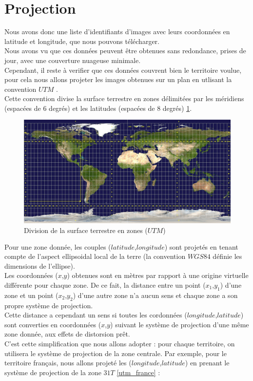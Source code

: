 \documentclass{book}
\begin{document}
\clearpage

\section{Projection}

Nous avons donc une liste d'identifiants d'images avec leurs coordonnées en latitude et longitude, que nous pouvons télécharger.\\
Nous avons vu que ces données peuvent être obtenues sans redondance, prises de jour, avec une couverture nuageuse minimale.\\
Cependant, il reste à verifier que ces données couvrent bien le territoire voulue, pour cela nous allons projeter les images obtenues
sur un plan en utlisant la convention $UTM$ \cite{wiki:utm}.\\
Cette convention divise la surface terrestre en zones délimitées par les méridiens (espacées de 6 degrés) et 
les latitudes (espacées de 8 degrés) \ref{utm}.
\begin{figure}[H]
\begin{center}
\includegraphics[scale=0.3]{images/utm_zones.jpg}
\end{center}
\caption{Division de la surface terrestre en zones ($UTM$) \cite{wiki:utm}}
\label{utm}
\end{figure}

\clearpage

Pour une zone donnée, les couples ($latitude$,$longitude$) sont projetés en tenant compte de l'aspect ellipsoidal local de la terre 
(la convention $WGS84$ définie les dimensions de l'ellipse).\\
Les coordonnées ($x$,$y$) obtenues sont en mètres par rapport à une origine virtuelle différente pour chaque zone. De ce fait, la distance
entre un point ($x_{1}$,$y_{1}$) d'une zone et un point ($x_{2}$,$y_{2}$) d'une autre zone n'a aucun sens et chaque zone a son propre système de projection.\\
Cette distance a cependant un sens si toutes les cordonnées ($longitude$,$latitude$) sont converties en coordonnées ($x$,$y$) suivant
le système de projection d'une même zone donnée, aux effets de distorsion prêt.\\
C'est cette simplification que nous allons adopter : pour chaque territoire, on utilisera le système de projection de la zone centrale.
Par exemple, pour le territoire français, nous allons projeté les ($longitude$,$latitude$) en prenant le système de projection
de la zone $31T$ \ref{utm_france} :
\end{document}
